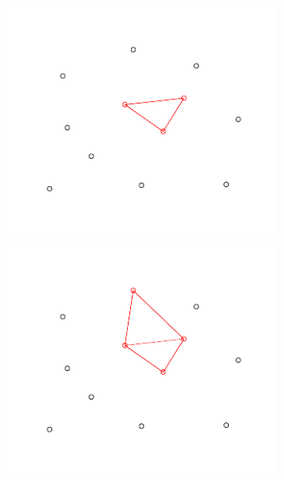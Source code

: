 \begin{figure}[h]
    \centering %
\begin{subfigure}{0.5\textwidth}
  \includegraphics[width=\linewidth]{./pictures/4/incremental_hull_1.pdf}
  \label{fig:3-douglas-peucker_1}
\end{subfigure}\hfil %
\begin{subfigure}{0.5\textwidth}
  \includegraphics[width=\linewidth]{./pictures/4/incremental_hull_2.pdf}
  \label{fig:3-douglas-peucker_2}
\end{subfigure}\hfil %

\end{figure}
